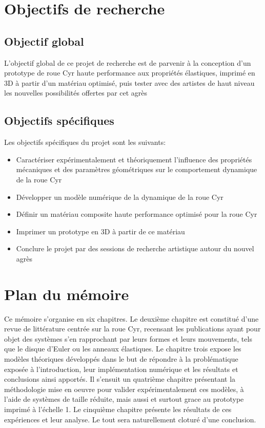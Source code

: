 \FloatBarrier


\section{Objectifs de recherche}  %
\subsection{Objectif global}
L'objectif global de ce projet de recherche est de parvenir à la conception d’un prototype de roue Cyr haute performance aux propriétés élastiques, imprimé en 3D à partir d’un matériau optimisé, puis tester avec des artistes de haut niveau les nouvelles possibilités offertes par cet agrès

\subsection{Objectifs spécifiques}
Les objectifs spécifiques du projet sont les suivants:
\begin{itemize}
\item Caractériser expérimentalement et théoriquement l’influence des propriétés mécaniques et des paramètres géométriques sur le comportement dynamique de la roue Cyr
\item Développer un modèle numérique de la dynamique de la roue Cyr
\item Définir un matériau composite haute performance optimisé pour la roue Cyr
\item Imprimer un prototype en 3D à partir de ce matériau
\item Conclure le projet par des sessions de recherche artistique autour du nouvel agrès
\end{itemize}


\section{Plan du mémoire}  %
Ce mémoire s'organise en six chapitres. Le deuxième chapitre est constitué d'une revue de littérature centrée sur la roue Cyr, recensant les publications ayant pour objet des systèmes s'en rapprochant par leurs formes et leurs mouvements, tels que le disque d'Euler ou les anneaux élastiques. Le chapitre trois expose les modèles théoriques développés dans le but de répondre à la problématique exposée à l'introduction, leur implémentation numérique et les résultats et conclusions ainsi apportés. Il s'ensuit un quatrième chapitre présentant la méthodologie mise en oeuvre pour valider expérimentalement ces modèles, à l'aide de systèmes de taille réduite, mais aussi et surtout grace au prototype imprimé à l'échelle 1. Le cinquième chapitre présente les résultats de ces expériences et leur analyse. Le tout sera naturellement cloturé d'une conclusion.